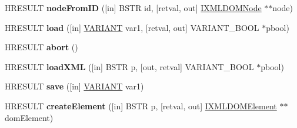 \begin{DoxyCompactItemize}
\item 
\mbox{\label{interface_m_s_x_m_l2_1_1_i_x_m_l_d_o_m_document_a751eab69e4b02f93e43f2bf797f15907}} 
H\+R\+E\+S\+U\+LT {\bfseries node\+From\+ID} (\mbox{[}in\mbox{]} B\+S\+TR id, \mbox{[}retval, out\mbox{]} \hyperlink{interface_m_s_x_m_l2_1_1_i_x_m_l_d_o_m_node}{I\+X\+M\+L\+D\+O\+M\+Node} $\ast$$\ast$node)
\item 
\mbox{\label{interface_m_s_x_m_l2_1_1_i_x_m_l_d_o_m_document_a44497bf88817e937ee1b0f14e62cec7a}} 
H\+R\+E\+S\+U\+LT {\bfseries load} (\mbox{[}in\mbox{]} \hyperlink{structtag_v_a_r_i_a_n_t}{V\+A\+R\+I\+A\+NT} var1, \mbox{[}retval, out\mbox{]} V\+A\+R\+I\+A\+N\+T\+\_\+\+B\+O\+OL $\ast$pbool)
\item 
\mbox{\label{interface_m_s_x_m_l2_1_1_i_x_m_l_d_o_m_document_a871c05778f6945b586d0aa25a103c2b5}} 
H\+R\+E\+S\+U\+LT {\bfseries abort} ()
\item 
\mbox{\label{interface_m_s_x_m_l2_1_1_i_x_m_l_d_o_m_document_aad034fc5a082971ba3453182f508fd54}} 
H\+R\+E\+S\+U\+LT {\bfseries load\+X\+ML} (\mbox{[}in\mbox{]} B\+S\+TR p, \mbox{[}out, retval\mbox{]} V\+A\+R\+I\+A\+N\+T\+\_\+\+B\+O\+OL $\ast$pbool)
\item 
\mbox{\label{interface_m_s_x_m_l2_1_1_i_x_m_l_d_o_m_document_ab04b05bb7a06019c1ffd3f05be74ab3b}} 
H\+R\+E\+S\+U\+LT {\bfseries save} (\mbox{[}in\mbox{]} \hyperlink{structtag_v_a_r_i_a_n_t}{V\+A\+R\+I\+A\+NT} var1)
\item 
\mbox{\label{interface_m_s_x_m_l2_1_1_i_x_m_l_d_o_m_document_aa63b6edfa8b6bb4ab271d7db04da8f37}} 
H\+R\+E\+S\+U\+LT {\bfseries create\+Element} (\mbox{[}in\mbox{]} B\+S\+TR p, \mbox{[}retval, out\mbox{]} \hyperlink{interface_m_s_x_m_l2_1_1_i_x_m_l_d_o_m_element}{I\+X\+M\+L\+D\+O\+M\+Element} $\ast$$\ast$dom\+Element)
\item 
\mbox{\label{interface_m_s_x_m_l2_1_1_i_x_m_l_d_o_m_document_a083c503c47aa36f6414bed9f76138272}} 

\end{DoxyCompactItemize}
